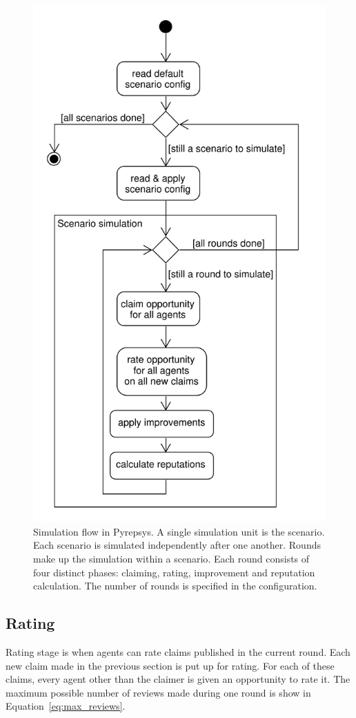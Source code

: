 \documentclass[%
    ]{\PathToTumTemplate/thesis/tum_thesis}
\begin{document}
\begin{figure}[tbp]
  \begin{center}
        \includegraphics[width=0.75\linewidth]	{../uml/simulation_flow.pdf}
    \caption{
    Simulation flow in Pyrepsys.
    A single simulation unit is the \gls{scenario}.
    Each \gls{scenario} is simulated independently after one another.
    Rounds make up the simulation within a \gls{scenario}.
    Each round consists of four distinct phases: claiming, rating, improvement and reputation calculation.
    The number of rounds is specified in the configuration.
    }
    \label{fig:simulation_flow}
  \end{center}
\end{figure}


\subsection{Rating}

Rating stage is when agents can rate claims published in the current round.
Each new claim made in the previous section is put up for rating.
For each of these claims, every agent other than the claimer is given an opportunity to rate it.
The maximum possible number of \glspl{review} made during one round is show in Equation~\ref{eq:max_reviews}.
\end{document}

